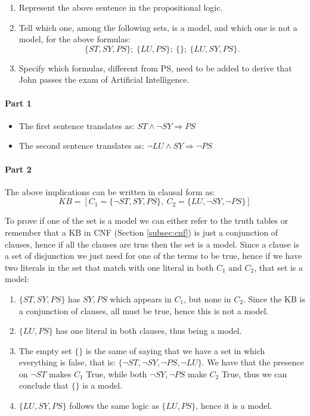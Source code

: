 \documentclass[10pt,a4paper]{article}
\begin{document}
\begin{enumerate}
\item Represent the above sentence in the propositional logic.
\item Tell which one, among the following sets, is a model, and which one is not a model, for the above formulas:
\[\lbrace ST,SY,PS\rbrace;\ \lbrace LU,PS\rbrace;\ \lbrace \rbrace;\ \lbrace LU,SY,PS\rbrace.\]
\item Specify which formulas, different from PS, need to be added to derive that John passes the exam of Artificial Intelligence.
\end{enumerate}

\paragraph{Part 1}
\begin{itemize}
\item The first sentence translates as: $ST \wedge \neg SY \Rightarrow PS$
\item The second sentence translates as: $\neg LU \wedge SY \Rightarrow \neg PS$
\end{itemize}

\paragraph{Part 2}
The above implications can be written in clausal form as:
\[KB=[ C_1=\lbrace \neg ST, SY, PS \rbrace,\ C_2=\lbrace LU, \neg SY, \neg PS \rbrace]\]


To prove if one of the set is a model we can either refer to the truth tables or remember that a KB in CNF (Section \ref{subsec:cnf}) is just a conjunction of clauses, hence if all the clauses are true then the set is a model. Since a clause is a set of disjunction we just need for one of the terms to be true, hence if we have two literals in the set that match with one literal in both $C_1$ and $C_2$, that set is a model:
 

\begin{enumerate}

\item $\lbrace ST,SY,PS\rbrace$ has $SY,PS$ which appears in $C_1$, but none in $C_2$. Since the KB is a conjunction of clauses, all must be true, hence this is not a model.
\item $\lbrace LU,PS\rbrace$ has one literal in both clauses, thus being a model.
\item The empty set $\lbrace \rbrace$ is the same of saying that we have a set in which everything is false, that is: $\lbrace  \neg ST, \neg SY, \neg PS, \neg LU\rbrace$. We have that the presence on $\neg ST$ makes $C_1$ True, while both $\neg SY, \neg PS$ make $C_2$ True, thus we can conclude that $\lbrace \rbrace$  is a model.
\item $ \lbrace LU,SY,PS\rbrace$ follows the same logic as $\lbrace LU,PS\rbrace$, hence it is a model.
\end{enumerate}
\end{document}
